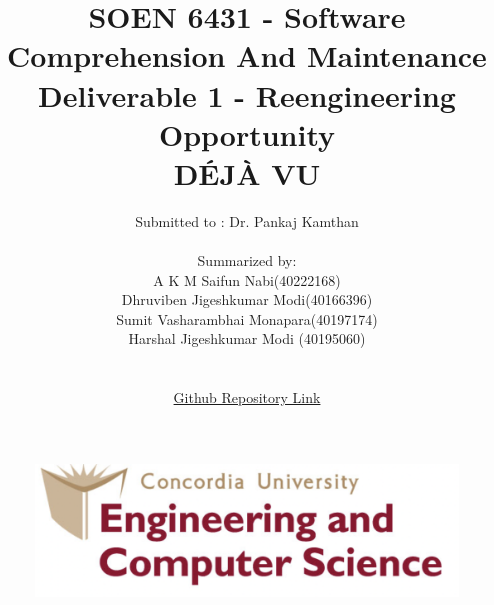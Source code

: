 \documentclass[12pt,letterpaper]{report}
\date{}
\begin{document}
\begin{figure}
    \centering
    \begin{center}
          \includegraphics[width=0.8\linewidth]{Images/img.jpg}
    \end{center}
\end{figure}
    \title{SOEN 6431 - Software Comprehension And Maintenance\\[1em]

   Deliverable 1 - Reengineering Opportunity\\ \textbf{DÉJÀ VU}}

\author{Submitted to : Dr. Pankaj Kamthan \\ \\
Summarized by:\\
A K M Saifun Nabi(40222168)\\
Dhruviben Jigeshkumar Modi(40166396)\\
Sumit Vasharambhai Monapara(40197174)\\
Harshal Jigeshkumar Modi (40195060)\\
\\\\
\centering
\href{https://github.com/mdhruvi/SOEN-6431-Deja-Vu}{Github Repository Link}\\
}
\maketitle
\pagebreak

\tableofcontents

\newpage
{}
\end{document}

